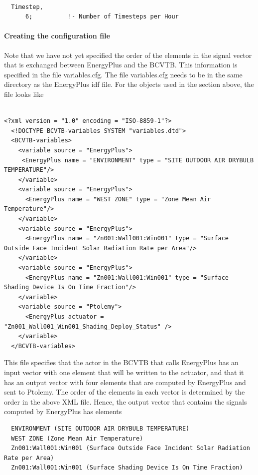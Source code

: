 \begin{lstlisting}

  Timestep,
      6;          !- Number of Timesteps per Hour
\end{lstlisting}

\paragraph{\textbf{Creating the configuration file}}\label{creating-the-configuration-file-1}

Note that we have not yet specified the order of the elements in the signal vector that is exchanged between EnergyPlus and the BCVTB. This information is specified in the file variables.cfg. The file variables.cfg needs to be in the same directory as the EnergyPlus idf file. For the objects used in the section above, the file looks like

\begin{lstlisting}

<?xml version = "1.0" encoding = "ISO-8859-1"?>
  <!DOCTYPE BCVTB-variables SYSTEM "variables.dtd">
  <BCVTB-variables>
    <variable source = "EnergyPlus">
     <EnergyPlus name = "ENVIRONMENT" type = "SITE OUTDOOR AIR DRYBULB TEMPERATURE"/>
    </variable>
    <variable source = "EnergyPlus">
      <EnergyPlus name = "WEST ZONE" type = "Zone Mean Air Temperature"/>
    </variable>
    <variable source = "EnergyPlus">
      <EnergyPlus name = "Zn001:Wall001:Win001" type = "Surface Outside Face Incident Solar Radiation Rate per Area"/>
    </variable>
    <variable source = "EnergyPlus">
      <EnergyPlus name = "Zn001:Wall001:Win001" type = "Surface Shading Device Is On Time Fraction"/>
    </variable>
    <variable source = "Ptolemy">
      <EnergyPlus actuator = "Zn001_Wall001_Win001_Shading_Deploy_Status" />
    </variable>
  </BCVTB-variables>
\end{lstlisting}

This file specifies that the actor in the BCVTB that calls EnergyPlus has an input vector with one element that will be written to the actuator, and that it has an output vector with four elements that are computed by EnergyPlus and sent to Ptolemy. The order of the elements in each vector is determined by the order in the above XML file. Hence, the output vector that contains the signals computed by EnergyPlus has elements

\begin{lstlisting}
  ENVIRONMENT (SITE OUTDOOR AIR DRYBULB TEMPERATURE)
  WEST ZONE (Zone Mean Air Temperature)
  Zn001:Wall001:Win001 (Surface Outside Face Incident Solar Radiation Rate per Area)
  Zn001:Wall001:Win001 (Surface Shading Device Is On Time Fraction)
\end{lstlisting}

